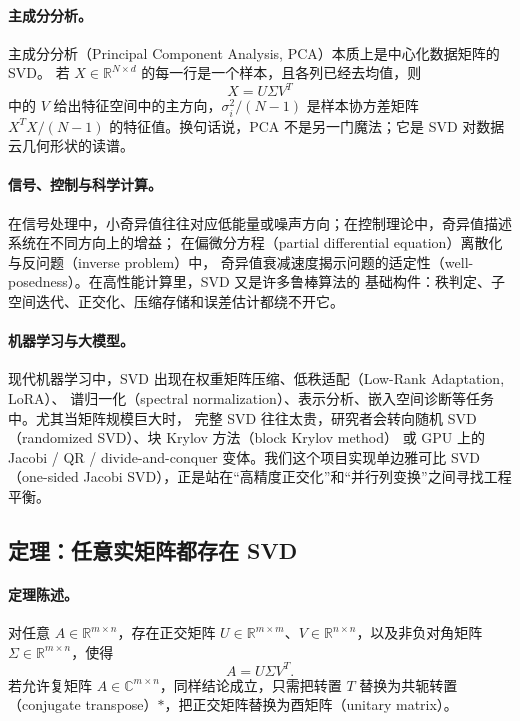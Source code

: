 \paragraph{主成分分析。}
主成分分析（Principal Component Analysis, PCA）本质上是中心化数据矩阵的 SVD。
若 $X\in\mathbb{R}^{N\times d}$ 的每一行是一个样本，且各列已经去均值，则
\[
    X=U\Sigma V^T
\]
中的 $V$ 给出特征空间中的主方向，$\sigma_i^2/(N-1)$ 是样本协方差矩阵
$X^TX/(N-1)$ 的特征值。换句话说，PCA 不是另一门魔法；它是 SVD 对数据云几何形状的读谱。

\paragraph{信号、控制与科学计算。}
在信号处理中，小奇异值往往对应低能量或噪声方向；在控制理论中，奇异值描述系统在不同方向上的增益；
在偏微分方程（partial differential equation）离散化与反问题（inverse problem）中，
奇异值衰减速度揭示问题的适定性（well-posedness）。在高性能计算里，SVD 又是许多鲁棒算法的
基础构件：秩判定、子空间迭代、正交化、压缩存储和误差估计都绕不开它。

\paragraph{机器学习与大模型。}
现代机器学习中，SVD 出现在权重矩阵压缩、低秩适配（Low-Rank Adaptation, LoRA）、
谱归一化（spectral normalization）、表示分析、嵌入空间诊断等任务中。尤其当矩阵规模巨大时，
完整 SVD 往往太贵，研究者会转向随机 SVD（randomized SVD）、块 Krylov 方法（block Krylov method）
或 GPU 上的 Jacobi / QR / divide-and-conquer 变体。我们这个项目实现单边雅可比 SVD
（one-sided Jacobi SVD），正是站在“高精度正交化”和“并行列变换”之间寻找工程平衡。

\subsection{定理：任意实矩阵都存在 SVD}

\paragraph{定理陈述。}
对任意 $A\in\mathbb{R}^{m\times n}$，存在正交矩阵
$U\in\mathbb{R}^{m\times m}$、$V\in\mathbb{R}^{n\times n}$，以及非负对角矩阵
$\Sigma\in\mathbb{R}^{m\times n}$，使得
\[
    A=U\Sigma V^T.
\]
若允许复矩阵 $A\in\mathbb{C}^{m\times n}$，同样结论成立，只需把转置 $T$ 替换为共轭转置
（conjugate transpose）$*$，把正交矩阵替换为酉矩阵（unitary matrix）。

